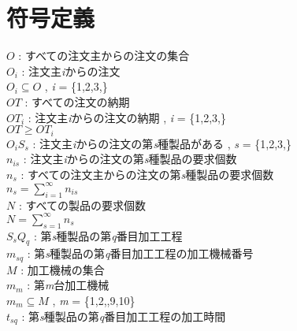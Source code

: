 \documentclass[twocolumn]{jarticle}
\begin{document}
\section{符号定義}

    $\textit{O}$ : すべての注文主からの注文の集合\\
    $O_{\textit{i}}$ : 注文主\textit{i}からの注文\\
    $\textit{O}_{\textit{i}} \subseteq \textit{O}$ , \textit{i} = \{1,2,3,\textellipsis\}\\
    $\textit{OT}$ : すべての注文の納期\\
    $OT_{\textit{i}}$ : 注文主\textit{i}からの注文の納期 , \textit{i} = \{1,2,3,\textellipsis\}\\
    $\textit{OT} \geq OT_{\textit{i}}$\\
    $O_{\textit{i}}S_{\textit{s}}$  : 注文主\textit{i}からの注文の第\textit{s}種製品がある , \textit{s} = \{1,2,3,\textellipsis\}\\
    $n_{\textit{is}}$ : 注文主\textit{i}からの注文の第\textit{s}種製品の要求個数\\
    $n_{\textit{s}}$ : すべての注文主からの注文の第\textit{s}種製品の要求個数\\
    $n_{\textit{s}} = \sum_{i=1}^{\infty} n_{\textit{is}}$ \\
    $\textit{N}$ : すべての製品の要求個数\\
    $\textit{N} = \sum_{s=1}^{\infty} n_{\textit{s}}$\\
    $S_{\textit{s}}Q_{\textit{q}}$  : 第\textit{s}種製品の第\textit{q}番目加工工程\\
    $m_{\textit{sq}}$ : 第\textit{s}種製品の第\textit{q}番目加工工程の加工機械番号\\
    $\textit{M}$ : 加工機械の集合\\
    $\textit{m}_{\textit{m}}$ : 第\textit{m}台加工機械\\
    $\textit{m}_{\textit{m}} \subseteq \textit{M}$ , \textit{m} = \{1,2,\textellipsis,9,10\}\\
    $t_{\textit{sq}}$ : 第\textit{s}種製品の第\textit{q}番目加工工程の加工時間\\
\end{document}
